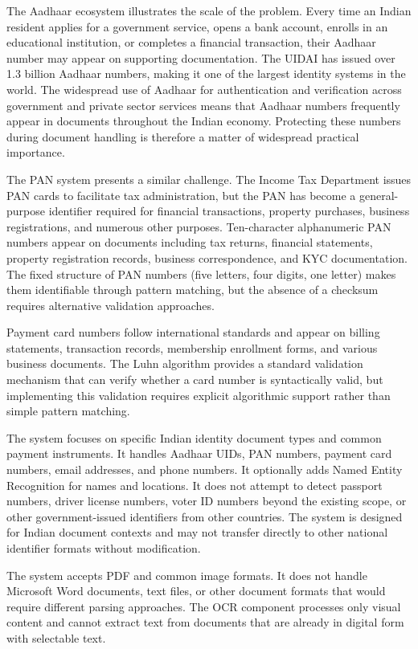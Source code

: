 The Aadhaar ecosystem illustrates the scale of the problem. Every time an Indian resident applies for a government service, opens a bank account, enrolls in an educational institution, or completes a financial transaction, their Aadhaar number may appear on supporting documentation. The UIDAI has issued over 1.3 billion Aadhaar numbers, making it one of the largest identity systems in the world. The widespread use of Aadhaar for authentication and verification across government and private sector services means that Aadhaar numbers frequently appear in documents throughout the Indian economy. Protecting these numbers during document handling is therefore a matter of widespread practical importance.

The PAN system presents a similar challenge. The Income Tax Department issues PAN cards to facilitate tax administration, but the PAN has become a general-purpose identifier required for financial transactions, property purchases, business registrations, and numerous other purposes. Ten-character alphanumeric PAN numbers appear on documents including tax returns, financial statements, property registration records, business correspondence, and KYC documentation. The fixed structure of PAN numbers (five letters, four digits, one letter) makes them identifiable through pattern matching, but the absence of a checksum requires alternative validation approaches.

Payment card numbers follow international standards and appear on billing statements, transaction records, membership enrollment forms, and various business documents. The Luhn algorithm provides a standard validation mechanism that can verify whether a card number is syntactically valid, but implementing this validation requires explicit algorithmic support rather than simple pattern matching.

\bigskip

The system focuses on specific Indian identity document types and common payment instruments. It handles Aadhaar UIDs, PAN numbers, payment card numbers, email addresses, and phone numbers. It optionally adds Named Entity Recognition for names and locations. It does not attempt to detect passport numbers, driver license numbers, voter ID numbers beyond the existing scope, or other government-issued identifiers from other countries. The system is designed for Indian document contexts and may not transfer directly to other national identifier formats without modification.

The system accepts PDF and common image formats. It does not handle Microsoft Word documents, text files, or other document formats that would require different parsing approaches. The OCR component processes only visual content and cannot extract text from documents that are already in digital form with selectable text.

